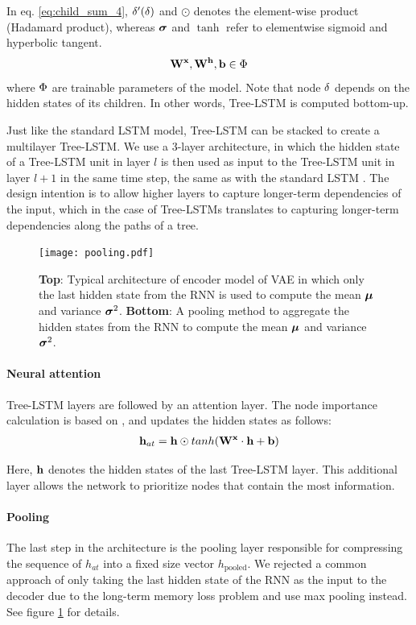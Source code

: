 In eq. \ref{eq:child_sum_4}, $\delta'(\delta)$ and $\odot$ denotes the element-wise product (Hadamard product), whereas $\boldsymbol\sigma$ and $\tanh$ refer to elementwise sigmoid and hyperbolic tangent. 
\begin{equation}
    \mathbf{W}^{\mathbf{x}}, \mathbf{W}^{\mathbf{h}}, \mathbf{b} \in \Phi
\end{equation}
where $\Phi$ are trainable parameters of the model. 
Note that node $\delta$ depends on the hidden states of its children. 
In other words, Tree-LSTM is computed bottom-up. 

Just like the standard LSTM model, Tree-LSTM can be stacked to create a multilayer Tree-LSTM. 
We use a 3-layer architecture, in which the hidden state of a Tree-LSTM unit in layer $l$ is then used as input to the Tree-LSTM unit in layer $l + 1$ in the same time step, the same as with the standard LSTM \cite{graves2013hybrid}. 
The design intention is to allow higher layers to capture longer-term dependencies of the input, which in the case of Tree-LSTMs translates to capturing longer-term dependencies along the paths of a tree.

\begin{figure}
    \centering
    \texttt{[image: pooling.pdf]}
    \caption[RNN pooling]{\textbf{Top}: Typical architecture of encoder model of VAE in which only the last hidden state from the RNN is used to compute the mean $\boldsymbol\mu$ and variance $\boldsymbol\sigma^2$. \textbf{Bottom}: A pooling method to aggregate the hidden states from the RNN to compute the mean $\boldsymbol\mu$ and variance $\boldsymbol\sigma^2$.}
    \label{fig:pooling}
\end{figure}




\paragraph{Neural attention} Tree-LSTM layers are followed by an attention layer. 
The node importance calculation is based on \cite{winata2018attention}, and updates the hidden states as follows:
\begin{align}
    \mathbf{h}_{at} = \mathbf{h} \odot tanh(\mathbf{W}^{\mathbf{x}} \cdot \mathbf{h} + \mathbf{b})
\end{align}

Here, $\mathbf{h}$ denotes the hidden states of the last Tree-LSTM layer. This additional layer allows the network to prioritize nodes that contain the most information. 


\paragraph{Pooling} 
The last step in the architecture is the pooling layer responsible for compressing the sequence of $h_{at}$ into a fixed size vector $h_\text{pooled}$. 
We rejected a common \cite{fabius2015variational} approach of only taking the last hidden state of the RNN as the input to the decoder due to the long-term memory loss problem \cite{kao2020comparison} and use max pooling instead.
See figure \ref{fig:pooling} for details.

